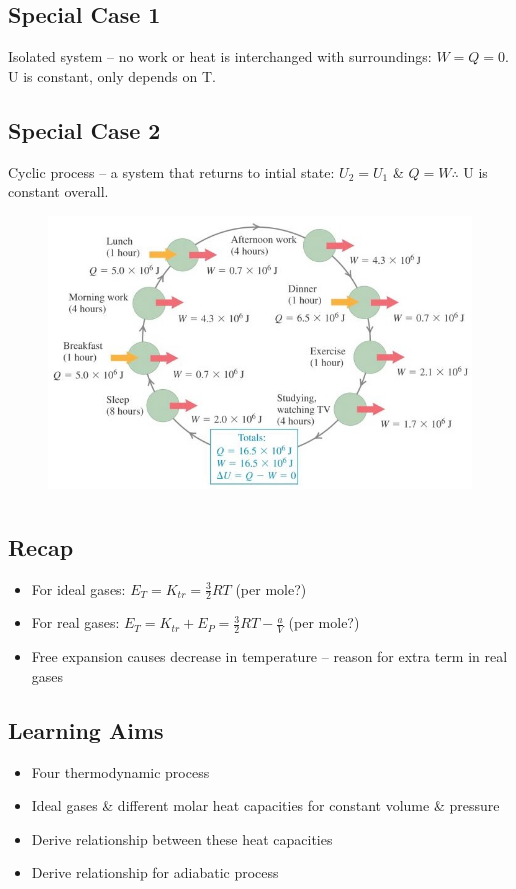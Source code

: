 \documentclass[a4paper, 11pt, normalem]{report}
\begin{document}
\section{Special Case 1}
Isolated system -- no work or heat is interchanged with surroundings: $W = Q = 0$.
U is constant, only depends on T.

\section{Special Case 2}
Cyclic process -- a system that returns to intial state: $U_{2} = U_{1}$ \& $Q = W \therefore$ U is constant overall.
\begin{figure}[H]
    \centering
    \includegraphics[scale=0.9]{Cyclic.jpg}
\end{figure}

\chapter{}
\section{Recap}
\begin{itemize}
    \item For ideal gases: $E_{T} = K_{tr} = \frac{3}{2}RT$ (per mole?)
    \item For real gases: $E_{T} = K_{tr} + E_{P} = \frac{3}{2}RT - \frac{a}{V}$ (per mole?)
    \item Free expansion causes decrease in temperature -- reason for extra term in real gases
\end{itemize}

\section{Learning Aims}
\begin{itemize}
	\item Four thermodynamic process
	\item Ideal gases \&  different molar heat capacities for constant volume \& pressure
	\item Derive relationship between these heat capacities
	\item Derive relationship for adiabatic process
\end{itemize}
\end{document}
